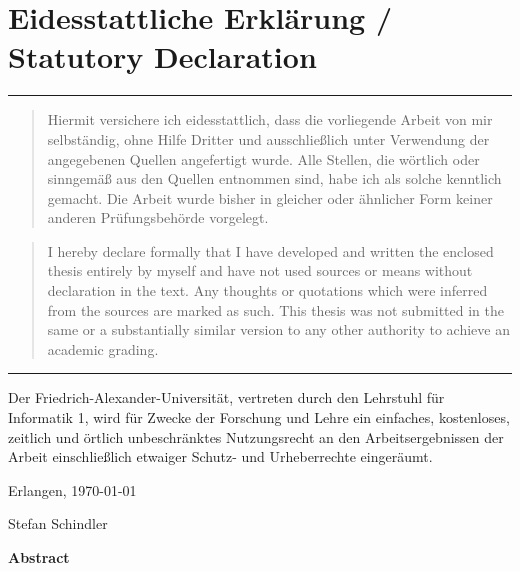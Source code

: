 \documentclass[10pt, a4paper, twoside=false, headsepline]{scrbook}
\renewcommand{\_}{\origunderscore\allowbreak}
\begin{document}
\pagestyle{scrplain}
\vspace*{\fill}
\section*{Eidesstattliche Erklärung / Statutory Declaration}

\vspace{0.1cm}
\noindent\hrule
\begin{quote}
Hiermit versichere ich eidesstattlich, dass die vorliegende Arbeit von mir
selbständig, ohne Hilfe Dritter und ausschließlich unter Verwendung der
angegebenen Quellen angefertigt wurde. Alle Stellen, die wörtlich oder
sinngemäß aus den Quellen entnommen sind, habe ich als solche kennt\-lich
gemacht. Die Arbeit wurde bisher in gleicher oder ähnlicher Form keiner anderen
Prüfungsbehörde vorgelegt.
\end{quote}

\begin{quote}
I hereby declare formally that I have developed and written the enclosed thesis
entirely by myself and have not used sources or means without declaration in
the text. Any thoughts or quotations which were inferred from the sources are
marked as such. This thesis was not submitted in the same or a substantially
similar version to any other authority to achieve an academic grading.
\end{quote}
\noindent\hrule

\vspace{0.5cm}
\noindent
Der Friedrich-Alexander-Universität, vertreten durch den Lehrstuhl
für Informatik 1, wird für Zwecke der Forschung und Lehre ein
einfaches, kostenloses, zeitlich und örtlich unbeschränktes
Nutzungsrecht an den Arbeitsergebnissen der Arbeit einschließlich
etwaiger Schutz- und Urheberrechte eingeräumt.

\vspace{0.5cm}
\noindent
Erlangen, \today

\vspace{1cm}
\begin{flushright}
Stefan Schindler \quad\null
\end{flushright}
\cleardoublepage

\null\newpage

\vspace*{\fill}
\begin{center}
{\large\textbf{Abstract}}
\end{center}
\end{document}
